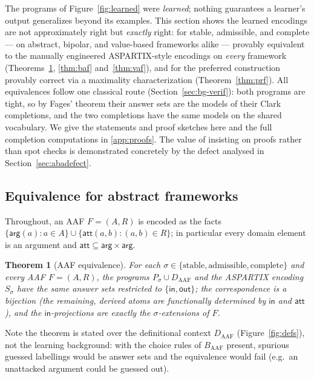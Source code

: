 \documentclass[review,12pt]{elsarticle}
\newtheorem{theorem}{Theorem}
\theoremstyle{definition}
\theoremstyle{remark}
\newcommand{\pred}[1]{\textsf{#1}}
\newcommand{\Daaf}{D_{\mathrm{AAF}}}
\begin{document}
The programs of Figure~\ref{fig:learned} were \emph{learned}; nothing
guarantees a learner's output generalizes beyond its examples. This section
shows the learned encodings are not approximately right but \emph{exactly}
right: for stable, admissible, and complete --- on abstract, bipolar, and
value-based frameworks alike --- provably equivalent to the manually
engineered ASPARTIX-style encodings on \emph{every} framework
(Theorems~\ref{thm:aaf}, \ref{thm:baf} and~\ref{thm:vaf}), and for the
preferred construction provably correct via a
maximality characterization (Theorem~\ref{thm:prf}). All equivalences follow
one classical route (Section~\ref{sec:bg-verif}): both programs are tight, so
by Fages' theorem their answer sets are the models of their Clark completions,
and the two completions have the same models on the shared vocabulary. We
give the statements and
proof sketches here and the full completion computations in \ref{app:proofs}.
The value of insisting on proofs rather than spot checks is demonstrated
concretely by the defect analysed in Section~\ref{sec:abadefect}.

\subsection{Equivalence for abstract frameworks}
\label{sec:thm1}

Throughout, an AAF $F=(A,R)$ is encoded as the facts
$\{\pred{arg}(a): a\in A\}\cup\{\pred{att}(a,b):(a,b)\in R\}$; in particular
every domain element is an argument and
$\pred{att}\subseteq\pred{arg}\times\pred{arg}$.

\begin{theorem}[AAF equivalence]
\label{thm:aaf}
For each $\sigma\in\{\text{stable},\text{admissible},\text{complete}\}$ and
every AAF $F=(A,R)$, the programs $P_\sigma\cup \Daaf$ and the ASPARTIX
encoding $S_\sigma$ have the same answer sets restricted to
$\{\pred{in},\pred{out}\}$; the correspondence is a bijection (the remaining,
derived atoms are functionally determined by $\pred{in}$ and $\pred{att}$),
and the $\pred{in}$-projections are exactly the $\sigma$-extensions of $F$.
\end{theorem}

Note the theorem is stated over the definitional context $\Daaf$
(Figure~\ref{fig:defs}), not the learning background: with the choice rules of
$B_{\mathrm{AAF}}$ present, spurious guessed labellings would be answer sets
and the equivalence would fail (e.g.\ an unattacked argument could be guessed
\pred{out}).
\end{document}
